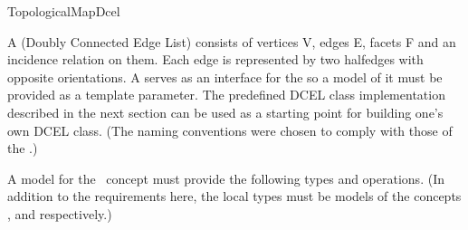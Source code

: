 
\ccRefPageBegin


\begin{ccRefConcept}{TopologicalMapDcel}

A  (Doubly Connected Edge List) consists of vertices V, edges E, facets F and an incidence relation on them. Each edge is
represented by two halfedges with opposite orientations. 
A  serves as an interface for the  so a model of it must be provided as a template parameter.
The predefined DCEL class
implementation described in the next section can be used 
as a starting point for
building one's own DCEL class. (The naming conventions were chosen to comply 
with those of the .)

A model for the \ccRefName\ concept must provide the following types and operations. 
(In addition to the requirements here, the local types 
must be models of the concepts 
,
 and
 respectively.)


\ccTypes

	\ccGlue
	\ccGlue
	\ccGlue


	\ccGlue
	\ccGlue



\end{ccRefConcept}
